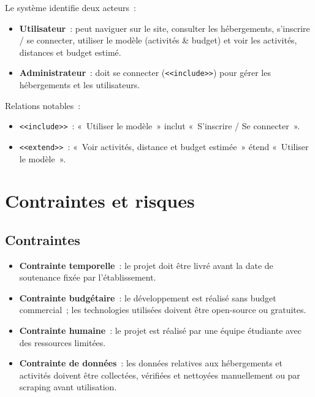 \documentclass[12pt,a4paper]{report}
\begin{document}
\noindent
Le système identifie deux acteurs~:
\begin{itemize}
  \item \textbf{Utilisateur}~: peut naviguer sur le site, consulter les
        hébergements, s'inscrire / se connecter, utiliser le modèle
        (activités \& budget) et voir les activités, distances et budget
        estimé.
  \item \textbf{Administrateur}~: doit se connecter (\texttt{<<include>>})
        pour gérer les hébergements et les utilisateurs.
\end{itemize}

\noindent
Relations notables~:
\begin{itemize}
  \item \texttt{<<include>>}~: «~Utiliser le modèle~» inclut
        «~S'inscrire / Se connecter~».
  \item \texttt{<<extend>>}~: «~Voir activités, distance et budget estimée~»
        étend «~Utiliser le modèle~».
\end{itemize}



\chapter{Contraintes et risques}

\section{Contraintes}

\begin{itemize}
  \item \textbf{Contrainte temporelle}~: le projet doit être livré avant la
        date de soutenance fixée par l'établissement.
  \item \textbf{Contrainte budgétaire}~: le développement est réalisé sans
        budget commercial~; les technologies utilisées doivent être
        open-source ou gratuites.
  \item \textbf{Contrainte humaine}~: le projet est réalisé par une équipe
        étudiante avec des ressources limitées.
  \item \textbf{Contrainte de données}~: les données relatives aux
        hébergements et activités doivent être collectées, vérifiées et
        nettoyées manuellement ou par scraping avant utilisation.
\end{itemize}
\end{document}
